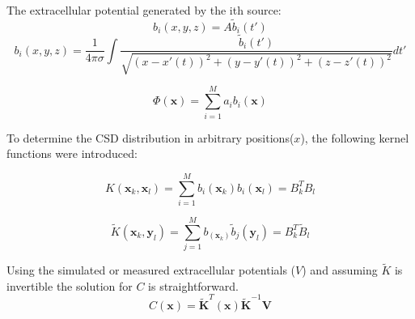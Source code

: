 \documentclass[11pt,a4paper,titlepage]{beamer}
\begin{document}
\begin{frame}

The extracellular potential generated by the ith source:
\begin{equation}
b_i (x,y,z)= A \tilde{b}_i (t') 
\end{equation}
\begin{equation}
b_i (x,y,z)= \frac{1}{4 \pi \sigma} \int
\frac{ \tilde{b}_i (t')}{\sqrt{(x-x'(t))^2+(y-y'(t))^2+(z-z'(t))^2}} dt'
\end{equation}


\begin{equation}
\Phi (\textbf{x})= \sum_{i=1}^M a_i b_i(\textbf{x})
\end{equation}





\end{frame}

\begin{frame}
To determine the CSD distribution in arbitrary positions($x$), the following kernel functions were introduced:

\begin{equation}
K(\textbf{x}_k,\textbf{x}_l)= \sum_{i=1}^M b_i (\textbf{x}_k) b_i (\textbf{x}_l) = B_k^T B_l
\end{equation} 
 
\begin{equation}
\tilde{K}(\textbf{x}_k,\textbf{y}_l)= \sum_{j=1}^M b_ (\textbf{x}_k) \tilde{b}_j (\textbf{y}_l)  = B_k^T \tilde{B}_l
\end{equation} 
 
Using the simulated or measured extracellular potentials ($V$) and assuming $\tilde{K}$ is invertible the solution for $C$ is straightforward.
 \begin{equation}
 C(\textbf{x})=\tilde{\textbf{K}}^T(\textbf{x})  
 \tilde{\textbf{K}}^{-1} \textbf{V}
 \end{equation}


\end{frame}
\end{document}
